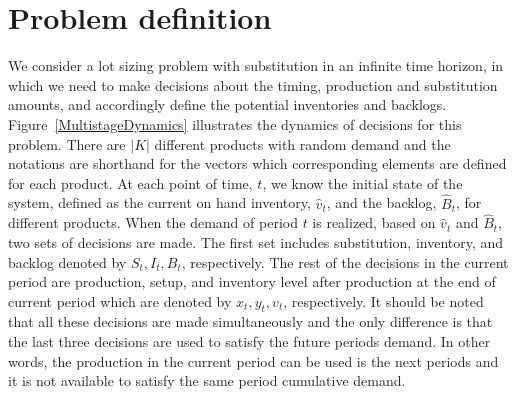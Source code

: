 \documentclass[10pt]{article}
\newcommand{\ti}{t} %
\newcommand{\KA}{K}
\newcommand{\Bi}{B} %
\newcommand{\Vi}{v} %
\newcommand{\Es}{S} %
\newcommand{\InvPos}{inventory level after production }
\begin{document}
\section{Problem definition}
We consider a lot sizing problem with substitution in an infinite time horizon, in which we need to make decisions about the timing, production and substitution amounts, and accordingly define the potential inventories and backlogs. Figure~\ref{MultistageDynamics} illustrates the dynamics of decisions for this problem. There are $|\KA|$ different products with random demand and the notations are shorthand for the vectors which corresponding elements are defined for each product.
At each point of time, $t$, we know the initial state of the system, defined as the current on hand inventory, $\hat{\Vi}_{\ti}$, and the backlog, $\hat{\Bi}_{\ti}$, for different products. When the demand of period $\ti$ is realized, based on $\hat{\Vi}_{\ti}$ and $\hat{\Bi}_{\ti}$, two sets of decisions are made. The first set includes substitution, inventory, and backlog denoted by $\Es_{\ti}, I_{\ti}, \Bi_{\ti}$, respectively. 
The rest of the decisions in the current period are production, setup, and \InvPos at the end of current period which are denoted by $x_{\ti}, y_{\ti}, v_{\ti}$, respectively.  It should be noted that all these decisions are made simultaneously and the only difference is that the last three decisions are used to satisfy the future periods demand. In other words, the production in the current period can be used is the next periods and it is not available to satisfy the same period cumulative demand.
\end{document}
